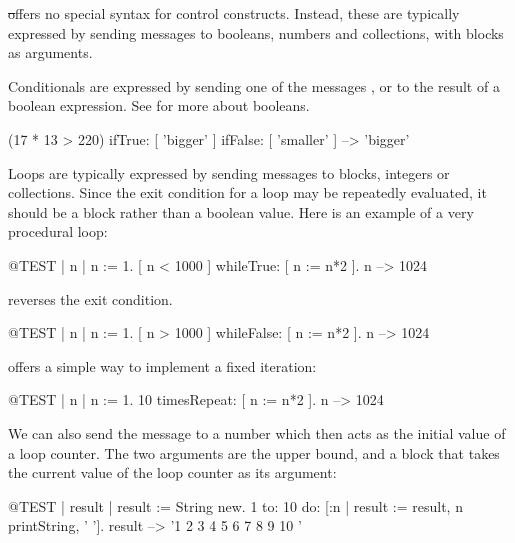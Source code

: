 \documentclass[a4paper,10pt,twoside]{book}
\begin{document}
\st offers no special syntax for control constructs.
Instead, these are typically expressed by sending messages to booleans, numbers and collections, with blocks as arguments.

Conditionals are expressed by sending one of the messages ,  or  to the result of a boolean expression. See  for more about booleans.

\begin{code}{}
(17 * 13 > 220)
   ifTrue: [ 'bigger' ]
   ifFalse: [ 'smaller' ] --> 'bigger'
\end{code}

Loops are typically expressed by sending messages to blocks, integers or collections.
Since the exit condition for a loop may be repeatedly evaluated, it should be a block rather than a boolean value.
Here is an example of a very procedural loop:

\begin{code}{@TEST | n |}
n := 1.
[ n < 1000 ] whileTrue: [ n := n*2 ].
n --> 1024
\end{code}

\noindent
{} reverses the exit condition.
\begin{code}{@TEST | n |}
n := 1.
[ n > 1000 ] whileFalse: [ n := n*2 ].
n --> 1024
\end{code}

\noindent
{} offers a simple way to implement a fixed iteration:

\begin{code}{@TEST | n |}
n := 1.
10 timesRepeat: [ n := n*2 ].
n --> 1024
\end{code}

We can also send the message  to a number which then acts as the initial value of a loop counter.
The two arguments are the upper bound, and a block that takes the current value of the loop counter as its argument:

\begin{code}{@TEST | result |}
result := String new.
1 to: 10 do: [:n | result := result, n printString, ' '].
result --> '1 2 3 4 5 6 7 8 9 10 '
\end{code}
\end{document}
